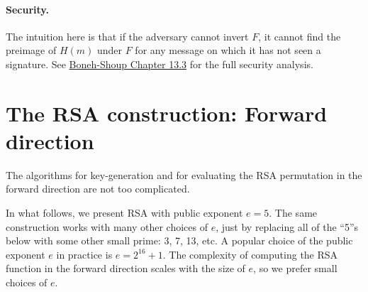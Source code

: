\paragraph{Security.}
The intuition here is that if the adversary cannot invert $F$,
it cannot find the preimage of $H(m)$ under $F$ for any message
on which it has not seen a signature.
See \href{https://toc.cryptobook.us/book.pdf#page=550}{Boneh-Shoup Chapter 13.3}
for the full security analysis.

\section{The RSA construction: Forward direction}

The algorithms for 
key-generation and 
for evaluating the RSA permutation
in the forward direction are not too complicated.

In what follows, we present RSA with 
public exponent $e=5$.
The same construction works with many other choices of $e$,
just by replacing all of the ``5''s below with some other
small prime: 3, 7, 13, etc.
A popular choice of the public exponent $e$ in practice is $e=2^{16}+1$.
The complexity of computing the RSA function in the forward
direction scales with the size of $e$, so we prefer small
choices of $e$.


